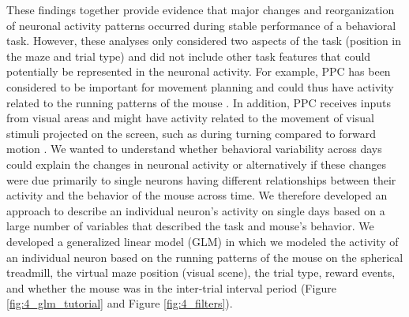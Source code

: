 These findings together provide evidence that major changes and reorganization of neuronal activity patterns occurred during stable performance of a behavioral task. However, these analyses only considered two aspects of the task (position in the maze and trial type) and did not include other task features that could potentially be represented in the neuronal activity. For example, PPC has been considered to be important for movement planning and could thus have activity related to the running patterns of the mouse \citep{Andersen2009, Nitz2006, Whitlock2012}. In addition, PPC receives inputs from visual areas and might have activity related to the movement of visual stimuli projected on the screen, such as during turning compared to forward motion \citep{Harvey:2012du, Oh2014}. We wanted to understand whether behavioral variability across days could explain the changes in neuronal activity or alternatively if these changes were due primarily to single neurons having different relationships between their activity and the behavior of the mouse across time. We therefore developed an approach to describe an individual neuron's activity on single days based on a large number of variables that described the task and mouse's behavior. We developed a generalized linear model (GLM) in which we modeled the activity of an individual neuron based on the running patterns of the mouse on the spherical treadmill, the virtual maze position (visual scene), the trial type, reward events, and whether the mouse was in the inter-trial interval period \citep{Friedman2010, Park2014} (Figure \ref{fig:4_glm_tutorial} and Figure \ref{fig:4_filters}). 

